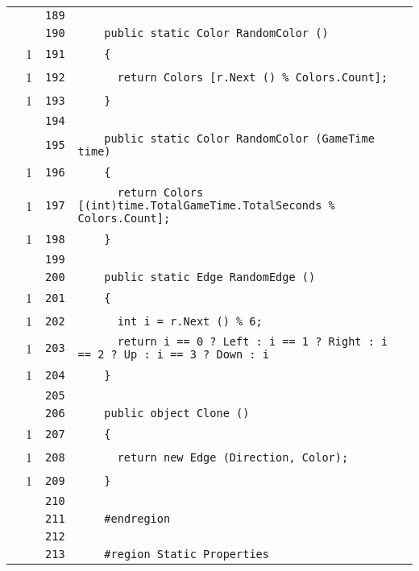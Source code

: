 \documentclass[a4paper,10pt]{article}
\begin{document}
\begin{longtable}[l]{lrrl}
\cellcolor{gray} &  & \verb~189~ & \verb~~\\
\cellcolor{gray} &  & \verb~190~ & \verb~    public static Color RandomColor ()~\\
\cellcolor{green} & 1 & \verb~191~ & \verb~    {~\\
\cellcolor{green} & 1 & \verb~192~ & \verb~      return Colors [r.Next () % Colors.Count];~\\
\cellcolor{green} & 1 & \verb~193~ & \verb~    }~\\
\cellcolor{gray} &  & \verb~194~ & \verb~~\\
\cellcolor{gray} &  & \verb~195~ & \verb~    public static Color RandomColor (GameTime time)~\\
\cellcolor{green} & 1 & \verb~196~ & \verb~    {~\\
\cellcolor{green} & 1 & \verb~197~ & \verb~      return Colors [(int)time.TotalGameTime.TotalSeconds % Colors.Count];~\\
\cellcolor{green} & 1 & \verb~198~ & \verb~    }~\\
\cellcolor{gray} &  & \verb~199~ & \verb~~\\
\cellcolor{gray} &  & \verb~200~ & \verb~    public static Edge RandomEdge ()~\\
\cellcolor{green} & 1 & \verb~201~ & \verb~    {~\\
\cellcolor{green} & 1 & \verb~202~ & \verb~      int i = r.Next () % 6;~\\
\cellcolor{green} & 1 & \verb~203~ & \verb~      return i == 0 ? Left : i == 1 ? Right : i == 2 ? Up : i == 3 ? Down : i ~\\
\cellcolor{green} & 1 & \verb~204~ & \verb~    }~\\
\cellcolor{gray} &  & \verb~205~ & \verb~~\\
\cellcolor{gray} &  & \verb~206~ & \verb~    public object Clone ()~\\
\cellcolor{green} & 1 & \verb~207~ & \verb~    {~\\
\cellcolor{green} & 1 & \verb~208~ & \verb~      return new Edge (Direction, Color);~\\
\cellcolor{green} & 1 & \verb~209~ & \verb~    }~\\
\cellcolor{gray} &  & \verb~210~ & \verb~~\\
\cellcolor{gray} &  & \verb~211~ & \verb~    #endregion~\\
\cellcolor{gray} &  & \verb~212~ & \verb~~\\
\cellcolor{gray} &  & \verb~213~ & \verb~    #region Static Properties~\\

\end{longtable}
\end{document}
